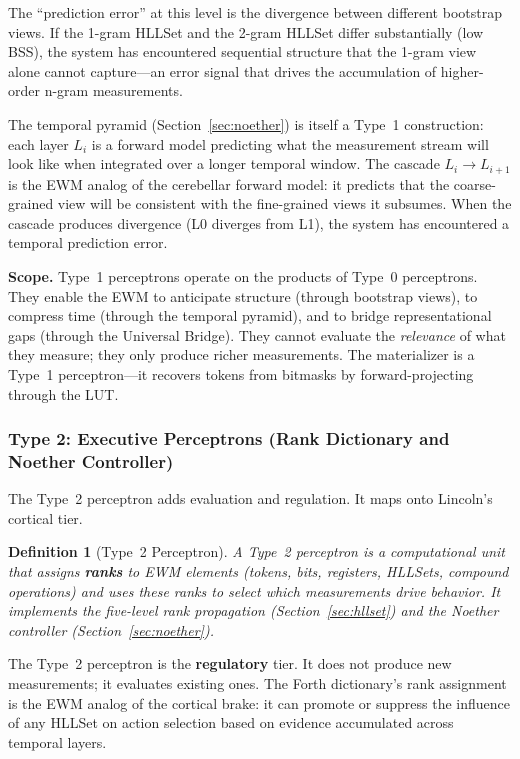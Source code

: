 \documentclass[11pt,a4paper]{article}
\newtheorem{definition}{Definition}[section]
\theoremstyle{remark}
\begin{document}
The ``prediction error'' at this level is the divergence between different
bootstrap views. If the 1-gram HLLSet and the 2-gram HLLSet differ
substantially (low BSS), the system has encountered sequential structure that
the 1-gram view alone cannot capture---an error signal that drives the
accumulation of higher-order n-gram measurements.

The temporal pyramid (Section~\ref{sec:noether}) is itself a Type~1
construction: each layer $L_i$ is a forward model predicting what the
measurement stream will look like when integrated over a longer temporal window.
The cascade $L_i \to L_{i+1}$ is the EWM analog of the cerebellar forward
model: it predicts that the coarse-grained view will be consistent with the
fine-grained views it subsumes. When the cascade produces divergence (L0
diverges from L1), the system has encountered a temporal prediction error.

\textbf{Scope.} Type~1 perceptrons operate on the products of Type~0
perceptrons. They enable the EWM to anticipate structure (through bootstrap
views), to compress time (through the temporal pyramid), and to bridge
representational gaps (through the Universal Bridge). They cannot evaluate the
\textit{relevance} of what they measure; they only produce richer measurements.
The materializer is a Type~1 perceptron---it recovers tokens from bitmasks by
forward-projecting through the LUT.

\subsubsection{Type 2: Executive Perceptrons (Rank Dictionary and Noether Controller)}

The Type~2 perceptron adds evaluation and regulation. It maps onto Lincoln's
cortical tier.

\begin{definition}[Type~2 Perceptron]
A Type~2 perceptron is a computational unit that assigns \textbf{ranks} to
EWM elements (tokens, bits, registers, HLLSets, compound operations) and uses
these ranks to select which measurements drive behavior. It implements the
five-level rank propagation (Section~\ref{sec:hllset}) and the Noether
controller (Section~\ref{sec:noether}).
\end{definition}

The Type~2 perceptron is the \textbf{regulatory} tier. It does not produce new
measurements; it evaluates existing ones. The Forth dictionary's rank assignment
is the EWM analog of the cortical brake: it can promote or suppress the
influence of any HLLSet on action selection based on evidence accumulated across
temporal layers.
\end{document}
